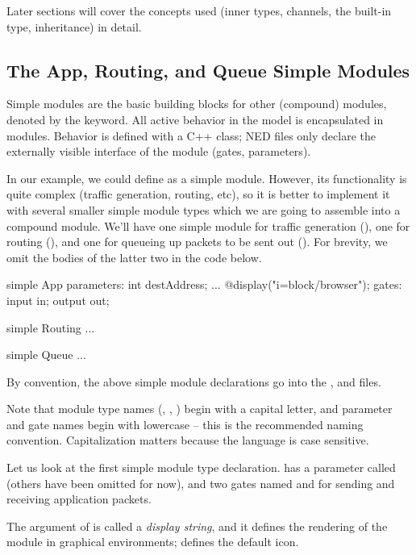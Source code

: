 Later sections will cover the concepts used (inner types, channels, the
 built-in type, inheritance) in detail.


\subsection{The App, Routing, and Queue Simple Modules}
Simple modules are the basic building blocks for other (compound) modules,
denoted by the  keyword.
All active behavior in the model is encapsulated in  modules.
Behavior is defined with a C++ class; NED files only declare the externally
visible interface of the module (gates, parameters).

In our example, we could define  as a simple module. However,
its functionality is quite complex (traffic generation, routing, etc),
so it is better to implement it with several smaller simple module types
which we are going to assemble into a compound module. We'll have
one simple module for traffic generation (), one for routing
(), and one for queueing up packets to be sent out ().
For brevity, we omit the bodies of the latter two in the code below.

\begin{ned}
simple App
{
    parameters:
        int destAddress;
        ...
        @display("i=block/browser");
    gates:
        input in;
        output out;
}

simple Routing
{
    ...
}

simple Queue
{
    ...
}
\end{ned}

By convention, the above simple module declarations go into the
,  and  files.

\begin{note}
    Note that module type names (, , )
    begin with a capital letter, and parameter and gate names begin with
    lowercase -- this is the recommended naming convention. Capitalization
    matters because the language is case sensitive.
\end{note}

Let us look at the first simple module type declaration.  has a
parameter called  (others have been omitted for now),
and two gates named  and  for sending and receiving
application packets.

The argument of  is called a \textit{display string},
and it defines the rendering of the module in graphical environments;
 defines the default icon.

